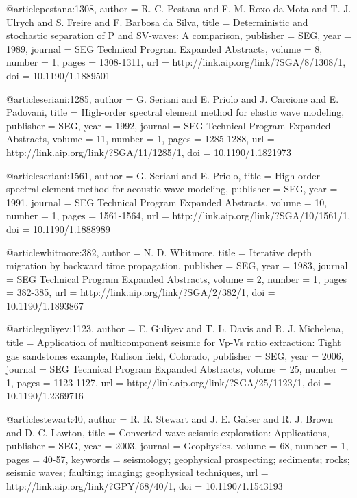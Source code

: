 @article{pestana:1308,
  author =	 {R. C. Pestana and F. M. Roxo da Mota and
                  T. J. Ulrych and S. Freire and F. Barbosa
                  da Silva},
  title =	 {Deterministic and stochastic separation of {P} and
                  {SV}-waves: A comparison},
  publisher =	 {SEG},
  year =	 1989,
  journal =	 {SEG Technical Program Expanded Abstracts},
  volume =	 8,
  number =	 1,
  pages =	 {1308-1311},
  url =		 {http://link.aip.org/link/?SGA/8/1308/1},
  doi =		 {10.1190/1.1889501}
}

@article{seriani:1285,
  author =	 {G. Seriani and E. Priolo and J. Carcione and
                  E. Padovani},
  title =	 {High-order spectral element method for elastic wave
                  modeling},
  publisher =	 {SEG},
  year =	 1992,
  journal =	 {SEG Technical Program Expanded Abstracts},
  volume =	 11,
  number =	 1,
  pages =	 {1285-1288},
  url =		 {http://link.aip.org/link/?SGA/11/1285/1},
  doi =		 {10.1190/1.1821973}
}

@article{seriani:1561,
  author =	 {G. Seriani and E. Priolo},
  title =	 {High-order spectral element method for acoustic wave
                  modeling},
  publisher =	 {SEG},
  year =	 1991,
  journal =	 {SEG Technical Program Expanded Abstracts},
  volume =	 10,
  number =	 1,
  pages =	 {1561-1564},
  url =		 {http://link.aip.org/link/?SGA/10/1561/1},
  doi =		 {10.1190/1.1888989}
}

@article{whitmore:382,
  author =	 {N. D. Whitmore},
  title =	 {Iterative depth migration by backward time
                  propagation},
  publisher =	 {SEG},
  year =	 1983,
  journal =	 {SEG Technical Program Expanded Abstracts},
  volume =	 2,
  number =	 1,
  pages =	 {382-385},
  url =		 {http://link.aip.org/link/?SGA/2/382/1},
  doi =		 {10.1190/1.1893867}
}

@article{guliyev:1123,
  author =	 {E. Guliyev and T. L. Davis and R.
                  J. Michelena},
  title =	 {Application of multicomponent seismic for Vp-Vs
                  ratio extraction: Tight gas sandstones example,
                  Rulison field, Colorado},
  publisher =	 {SEG},
  year =	 2006,
  journal =	 {SEG Technical Program Expanded Abstracts},
  volume =	 25,
  number =	 1,
  pages =	 {1123-1127},
  url =		 {http://link.aip.org/link/?SGA/25/1123/1},
  doi =		 {10.1190/1.2369716}
}

@article{stewart:40,
  author =	 {R. R. Stewart and J. E. Gaiser and R. J.
                  Brown and D. C. Lawton},
  title =	 {Converted-wave seismic exploration: Applications},
  publisher =	 {SEG},
  year =	 2003,
  journal =	 {Geophysics},
  volume =	 68,
  number =	 1,
  pages =	 {40-57},
  keywords =	 {seismology; geophysical prospecting; sediments;
                  rocks; seismic waves; faulting; imaging; geophysical
                  techniques},
  url =		 {http://link.aip.org/link/?GPY/68/40/1},
  doi =		 {10.1190/1.1543193}
}

